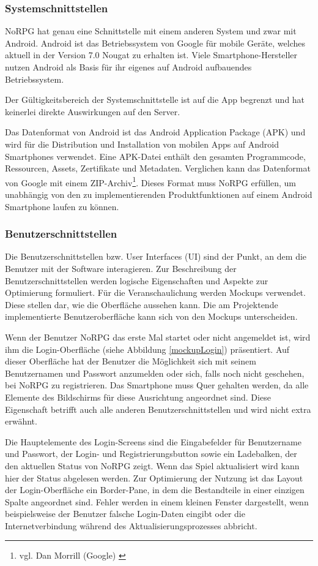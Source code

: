 		\subsubsection{Systemschnittstellen}
			NoRPG hat genau eine Schnittstelle mit einem anderen System und zwar mit Android. Android ist das Betriebssystem von Google für mobile Geräte, welches aktuell in der Version 7.0 Nougat zu erhalten ist. Viele Smartphone-Hersteller nutzen Android als Basis für ihr eigenes auf Android aufbauendes Betriebssystem. 
			
			Der Gültigkeitsbereich der Systemschnittstelle ist auf die App begrenzt und hat keinerlei direkte Auswirkungen auf den Server. 
			
			Das Datenformat von Android ist das Android Application Package (APK) und wird für die Distribution und Installation von mobilen Apps auf Android Smartphones verwendet. Eine APK-Datei enthält den gesamten Programmcode, Ressourcen, Assets, Zertifikate und Metadaten. Verglichen kann das Datenformat von Google mit einem ZIP-Archiv\footnote{vgl. Dan Morrill (Google) \cite{google1}}. Dieses Format muss NoRPG erfüllen, um unabhängig von den zu implementierenden Produktfunktionen auf einem Android Smartphone laufen zu können.
			
		\subsubsection{Benutzerschnittstellen}
			Die Benutzerschnittstellen bzw. User Interfaces (UI) sind der Punkt, an dem die Benutzer mit der Software interagieren. Zur Beschreibung der Benutzerschnittstellen werden logische Eigenschaften und Aspekte zur Optimierung formuliert. Für die Veranschaulichung werden Mockups verwendet. Diese stellen dar, wie die Oberfläche aussehen kann. Die am Projektende implementierte Benutzeroberfläche kann sich von den Mockups unterscheiden.
			
			Wenn der Benutzer NoRPG das erste Mal startet oder nicht angemeldet ist, wird ihm die Login-Oberfläche (siehe Abbildung \ref{mockupLogin}) präsentiert. Auf dieser Oberfläche hat der Benutzer die Möglichkeit sich mit seinem Benutzernamen und Passwort anzumelden oder sich, falls noch nicht geschehen, bei NoRPG zu registrieren. Das Smartphone muss Quer gehalten werden, da alle Elemente des Bildschirms für diese Ausrichtung angeordnet sind. Diese Eigenschaft betrifft auch alle anderen Benutzerschnittstellen und wird nicht extra erwähnt.  
			
			Die Hauptelemente des Login-Screens sind die Eingabefelder für Benutzername und Passwort, der Login- und Registrierungsbutton sowie ein Ladebalken, der den aktuellen Status von NoRPG zeigt. Wenn das Spiel aktualisiert wird kann hier der Status abgelesen werden. Zur Optimierung der Nutzung ist das Layout der Login-Oberfläche ein Border-Pane, in dem die Bestandteile in einer einzigen Spalte angeordnet sind. Fehler werden in einem kleinen Fenster dargestellt, wenn beispielsweise der Benutzer falsche Login-Daten eingibt oder die Internetverbindung während des Aktualisierungsprozesses abbricht.

